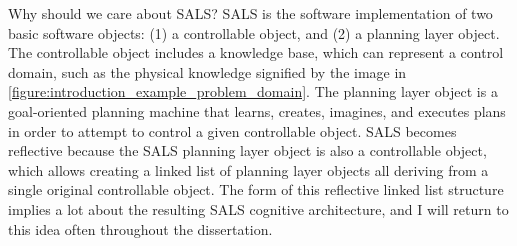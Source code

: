 Why should we care about SALS?  SALS is the software implementation of
two basic software objects: (1) a controllable object, and (2) a
planning layer object.  The controllable object includes a knowledge
base, which can represent a control domain, such as the physical
knowledge signified by the image in
{\autoref{figure:introduction_example_problem_domain}}.  The planning
layer object is a goal-oriented planning machine that learns, creates,
imagines, and executes plans in order to attempt to control a given
controllable object.  SALS becomes reflective because the SALS
planning layer object is also a controllable object, which allows
creating a linked list of planning layer objects all deriving from a
single original controllable object.  The form of this reflective
linked list structure implies a lot about the resulting SALS cognitive
architecture, and I will return to this idea often throughout the
dissertation.

